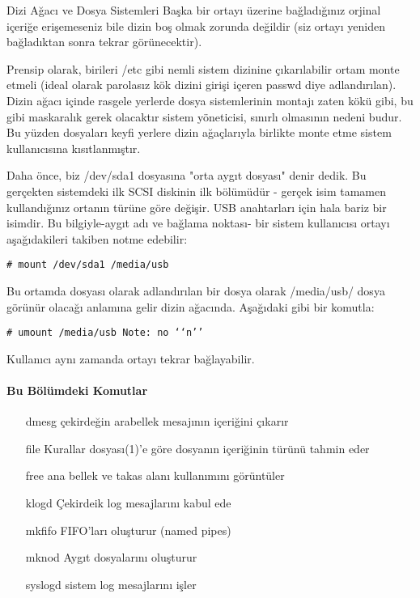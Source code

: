 \begin{section}{Dizi Ağacı ve Dosya Sistemleri}
Başka bir ortayı üzerine bağladığınız orjinal içeriğe erişemeseniz bile dizin boş olmak zorunda değildir (siz ortayı yeniden bağladıktan sonra tekrar görünecektir).

Prensip olarak, birileri /etc gibi nemli sistem dizinine çıkarılabilir ortam monte etmeli (ideal olarak parolasız kök dizini girişi içeren passwd diye adlandırılan). Dizin ağacı içinde rasgele yerlerde dosya sistemlerinin montajı zaten kökü gibi, bu gibi maskaralık gerek olacaktır sistem yöneticisi, sınırlı olmasının nedeni budur. Bu yüzden dosyaları keyfi yerlere dizin ağaçlarıyla birlikte monte etme sistem kullanıcısına kısıtlanmıştır. 

Daha önce, biz /dev/sda1 dosyasına "orta aygıt dosyası" denir dedik. Bu gerçekten sistemdeki ilk SCSI diskinin ilk bölümüdür - gerçek isim tamamen kullandığınız ortanın türüne göre değişir. USB anahtarları için hala bariz bir isimdir. Bu bilgiyle-aygıt adı ve bağlama noktası- bir sistem kullanıcısı ortayı aşağıdakileri takiben notme edebilir: 
\begin{verbatim}
# mount /dev/sda1 /media/usb
\end{verbatim}

Bu ortamda dosyası olarak adlandırılan bir dosya olarak /media/usb/ dosya görünür olacağı anlamına gelir dizin ağacında. Aşağıdaki gibi bir komutla:
\begin{verbatim}
# umount /media/usb Note: no ‘‘n’’
\end{verbatim}

Kullanıcı aynı zamanda ortayı tekrar bağlayabilir.

\paragraph{Bu Bölümdeki Komutlar}{
\begin{itemize}
\item[dmesg]çekirdeğin arabellek mesajının içeriğini çıkarır
\item[file]Kurallar dosyası(1)'e göre dosyanın içeriğinin türünü tahmin eder
\item[free]ana bellek ve takas alanı kullanımını görüntüler
\item[klogd]Çekirdeik log mesajlarını kabul ede
\item[mkfifo]FIFO'ları oluşturur (named pipes)
\item[mknod]Aygıt dosyalarını oluşturur
\item[syslogd]sistem log mesajlarını işler
\end{itemize}}


\end{section}
